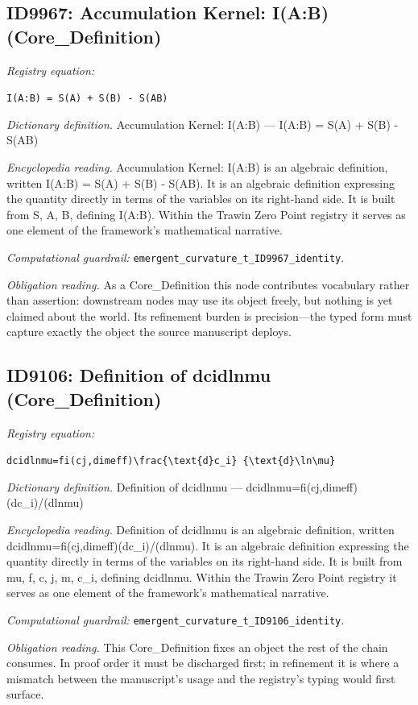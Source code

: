 \documentclass[11pt]{article}
\theoremstyle{remark}
\begin{document}
\subsection{ID9967: Accumulation Kernel: I(A:B) (Core\_Definition)}

\noindent\textit{Registry equation:}\par
{\small\texttt{I(A:B) = S(A) + S(B) - S(AB)}}\par\medskip
\noindent\textit{Dictionary definition.} Accumulation Kernel: I(A:B) --- I(A:B) = S(A) + S(B) - S(AB)\par\medskip
\noindent\textit{Encyclopedia reading.} Accumulation Kernel: I(A:B) is an algebraic definition, written I(A:B) = S(A) + S(B) - S(AB). It is an algebraic definition expressing the quantity directly in terms of the variables on its right-hand side. It is built from S, A, B, defining I(A:B). Within the Trawin Zero Point registry it serves as one element of the framework's mathematical narrative.
\par\medskip\noindent\textit{Computational guardrail:} \texttt{emergent\_curvature\_t\_ID9967\_identity}.
\par\medskip\noindent\textit{Obligation reading.} As a Core\_Definition this node contributes vocabulary rather than assertion: downstream nodes may use its object freely, but nothing is yet claimed about the world. Its refinement burden is precision---the typed form must capture exactly the object the source manuscript deploys.

\subsection{ID9106: Definition of dcidlnmu (Core\_Definition)}

\noindent\textit{Registry equation:}\par
{\small\texttt{dcidlnmu=fi(cj,dimeff)\textbackslash{}frac\{\textbackslash{}text\{d\}c\_i\} \{\textbackslash{}text\{d\}\textbackslash{}ln\textbackslash{}mu\}}}\par\medskip
\noindent\textit{Dictionary definition.} Definition of dcidlnmu --- dcidlnmu=fi(cj,dimeff)(dc\_i)/(dlnmu)\par\medskip
\noindent\textit{Encyclopedia reading.} Definition of dcidlnmu is an algebraic definition, written dcidlnmu=fi(cj,dimeff)(dc\_i)/(dlnmu). It is an algebraic definition expressing the quantity directly in terms of the variables on its right-hand side. It is built from mu, f, c, j, m, c\_i, defining dcidlnmu. Within the Trawin Zero Point registry it serves as one element of the framework's mathematical narrative.
\par\medskip\noindent\textit{Computational guardrail:} \texttt{emergent\_curvature\_t\_ID9106\_identity}.
\par\medskip\noindent\textit{Obligation reading.} This Core\_Definition fixes an object the rest of the chain consumes. In proof order it must be discharged first; in refinement it is where a mismatch between the manuscript's usage and the registry's typing would first surface.
\end{document}
